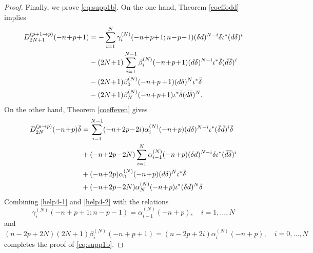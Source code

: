 \documentclass[a4paper,12pt,reqno]{amsart}
\numberwithin{theorem}{subsection}
\numberwithin{equation}{section}
\begin{document}
\begin{proof}
Finally, we prove \eqref{eq:supp1b}. On the one hand, Theorem \ref{coeffodd}
implies
\begin{align}\label{help4-1}
   D_{2N+1}^{(p+1 \to p)}(-n\!+\!p\!+\!1)
   & = -\sum_{i=1}^N \gamma_i^{(N)}(-n\!+\!p\!+\!1;n\!-\!p\!-\!1)
   (\delta {d})^{N-i} \delta \iota^*(\bar{d}\bar{\delta})^i \notag \\
   & - (2N\!+\!1) \sum_{i=1}^{N-1} \beta_i^{(N)}(-n\!+\!p\!+\!1) ({d} \delta)^{N-i} \iota^*
   \bar{\delta} (\bar{d} \bar{\delta})^i \notag \\
   & - (2N\!+\!1) \beta_0^{(N)}(-n\!+\!p+\!1) ({d} \delta)^N \iota^* \bar{\delta} \notag \\
   & - (2N\!+\!1) \beta_N^{(N)}(-n\!+\!p\!+\!1) \iota^* \bar{\delta} (\bar{d} \bar{\delta})^N.
\end{align}
On the other hand, Theorem \ref{coeffeven} gives
\begin{align}\label{help4-2}
   D_{2N}^{(p \to p)}(-n\!+\!p) \bar{\delta}
   & = \sum_{i=1}^{N-1} (-n\!+\!2p\!-\!2i) \alpha_i^{(N)}(-n\!+\!p)
   ({d}\delta)^{N-i} \iota^* (\bar{\delta} \bar{d})^i \bar{\delta} \notag \\
   & + (-n\!+\!2p\!-\!2N) \sum_{i=1}^N \alpha_{i-1}^{(N)}(-n\!+\!p)
   (\delta {d})^{N-i} \delta \iota^* (\bar{d} \bar{\delta})^i \notag \\
   & + (-n\!+\!2p) \alpha_0^{(N)}(-n\!+\!p) ({d} \delta)^{N} \iota^* \bar{\delta} \notag \\
   & + (-n\!+\!2p\!-\!2N) \alpha_N^{(N)}(-n\!+\!p) \iota^* (\bar{\delta} \bar{d})^N \bar{\delta}
\end{align}
Combining \eqref{help4-1} and \eqref{help4-2} with the relations
\begin{equation}\label{rel-4b}
   \gamma_i^{(N)}(-n\!+\!p\!+\!1;n\!-\!p\!-\!1) = \alpha_{i-1}^{(N)}(-n\!+\!p), \quad i=1,\dots,N
\end{equation}
and
\begin{equation}\label{rel-4a}
   (n\!-\!2p\!+\!2N) (2N\!+\!1) \beta_i^{(N)}(-n\!+\!p\!+\!1) = (n\!-\!2p\!+\!2i) \alpha_i^{(N)}(-n\!+\!p),
   \quad i=0,\dots,N
\end{equation}
completes the proof of \eqref{eq:supp1b}.


\end{proof}
\end{document}
